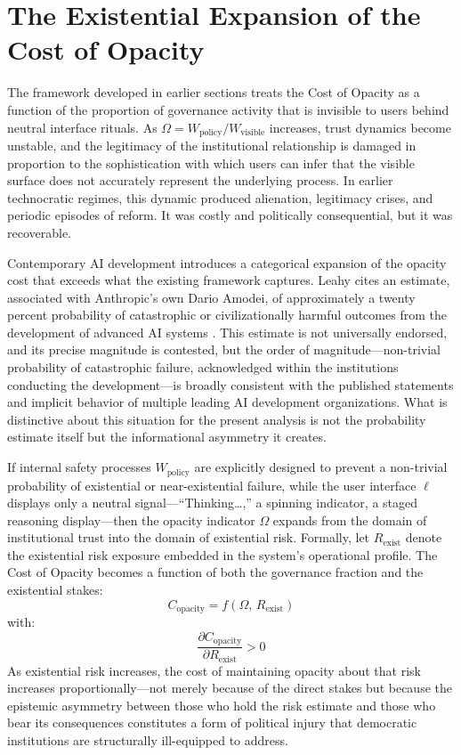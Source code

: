 \documentclass[12pt]{article}
\begin{document}
\section{The Existential Expansion of the Cost of Opacity}

The framework developed in earlier sections treats the Cost of Opacity as a function of the proportion of governance activity that is invisible to users behind neutral interface rituals. As $\Omega = W_{\text{policy}} / W_{\text{visible}}$ increases, trust dynamics become unstable, and the legitimacy of the institutional relationship is damaged in proportion to the sophistication with which users can infer that the visible surface does not accurately represent the underlying process. In earlier technocratic regimes, this dynamic produced alienation, legitimacy crises, and periodic episodes of reform. It was costly and politically consequential, but it was recoverable.

Contemporary AI development introduces a categorical expansion of the opacity cost that exceeds what the existing framework captures. Leahy cites an estimate, associated with Anthropic's own Dario Amodei, of approximately a twenty percent probability of catastrophic or civilizationally harmful outcomes from the development of advanced AI systems \citep{Leahy2024}. This estimate is not universally endorsed, and its precise magnitude is contested, but the order of magnitude---non-trivial probability of catastrophic failure, acknowledged within the institutions conducting the development---is broadly consistent with the published statements and implicit behavior of multiple leading AI development organizations. What is distinctive about this situation for the present analysis is not the probability estimate itself but the informational asymmetry it creates.

If internal safety processes $W_{\text{policy}}$ are explicitly designed to prevent a non-trivial probability of existential or near-existential failure, while the user interface $\ell$ displays only a neutral signal---``Thinking\ldots,'' a spinning indicator, a staged reasoning display---then the opacity indicator $\Omega$ expands from the domain of institutional trust into the domain of existential risk. Formally, let $R_{\text{exist}}$ denote the existential risk exposure embedded in the system's operational profile. The Cost of Opacity becomes a function of both the governance fraction and the existential stakes:
\[
C_{\text{opacity}} = f(\Omega,\, R_{\text{exist}})
\]
with:
\[
\frac{\partial C_{\text{opacity}}}{\partial R_{\text{exist}}} > 0
\]
As existential risk increases, the cost of maintaining opacity about that risk increases proportionally---not merely because of the direct stakes but because the epistemic asymmetry between those who hold the risk estimate and those who bear its consequences constitutes a form of political injury that democratic institutions are structurally ill-equipped to address.
\end{document}
